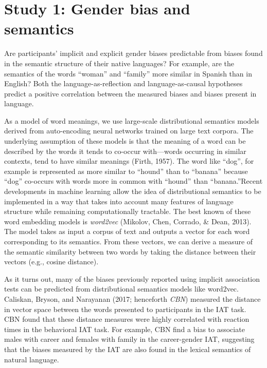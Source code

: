 \documentclass[man,floatsintext]{apa6}
\theoremstyle{definition}
\theoremstyle{definition}
\theoremstyle{definition}
\theoremstyle{remark}
\begin{document}
\section{Study 1: Gender bias and
semantics}\label{study-1-gender-bias-and-semantics}

Are participants' implicit and explicit gender biases predictable from
biases found in the semantic structure of their native languages? For
example, are the semantics of the words \enquote{woman} and
\enquote{family} more similar in Spanish than in English? Both the
language-as-reflection and language-as-causal hypotheses predict a
positive correlation between the measured biases and biases present in
language.

As a model of word meanings, we use large-scale distributional semantics
models derived from auto-encoding neural networks trained on large text
corpora. The underlying assumption of these models is that the meaning
of a word can be described by the words it tends to co-occur
with---words occurring in similar contexts, tend to have similar
meanings (Firth, 1957). The word like \enquote{dog}, for example is
represented as more similar to \enquote{hound} than to \enquote{banana}
because \enquote{dog} co-occurs with words more in common with
\enquote{hound} than \enquote{banana.}Recent developments in machine
learning allow the idea of distributional semantics to be implemented in
a way that takes into account many features of language structure while
remaining computationally tractable. The best known of these word
embedding models is \emph{word2vec} (Mikolov, Chen, Corrado, \& Dean,
2013). The model takes as input a corpus of text and outputs a vector
for each word corresponding to its semantics. From these vectors, we can
derive a measure of the semantic similarity between two words by taking
the distance between their vectors (e.g., cosine distance).

As it turns out, many of the biases previously reported using implicit
association tests can be predicted from distributional semantics models
like word2vec. Caliskan, Bryson, and Narayanan (2017; henceforth
\emph{CBN}) measured the distance in vector space between the words
presented to participants in the IAT task. CBN found that these distance
measures were highly correlated with reaction times in the behavioral
IAT task. For example, CBN find a bias to associate males with career
and females with family in the career-gender IAT, suggesting that the
biases measured by the IAT are also found in the lexical semantics of
natural language.
\end{document}
